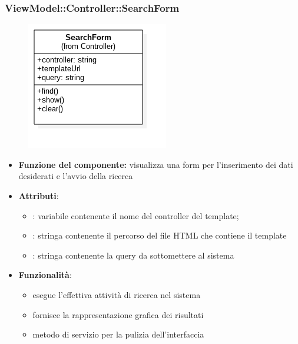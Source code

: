  \subsubsection{ViewModel::Controller::SearchForm}
 \begin{figure}[h!]
\begin{center}
	\includegraphics[scale=0.4]{../images/ViewModel/Controller/SearchForm.png}
\end{center}
\end{figure}
 \begin{itemize}
 \item\textbf{Funzione del componente:} visualizza una form per l’inserimento dei dati desiderati e l’avvio della ricerca
 \item\textbf{Attributi}:
 	\begin{itemize}
 		\item{}: variabile contenente il nome del controller del template;\\
		
		\item{}: stringa contenente il percorso del file HTML che contiene il template\\
		\item{}: stringa contenente la query da sottomettere al sistema\\
 	\end{itemize}
 	\item\textbf{Funzionalità}:
 	\begin{itemize}
 		\item{} esegue l'effettiva attività di ricerca nel sistema\\
		\item{} fornisce la rappresentazione grafica dei risultati\\
		\item{} metodo di servizio per la pulizia dell'interfaccia\\
 	\end{itemize}
 \end{itemize}
\newpage
 
